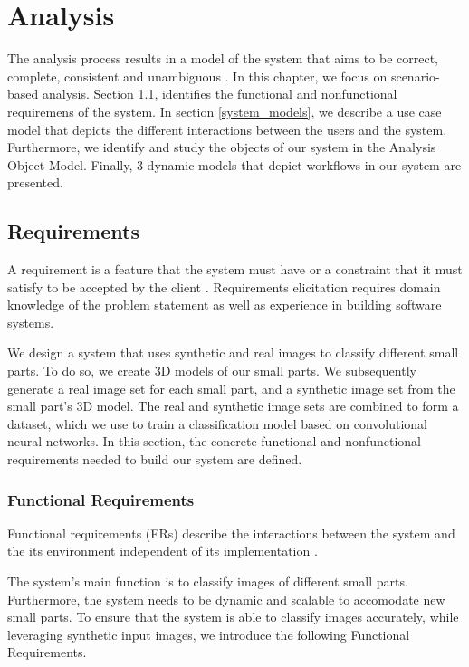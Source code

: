 \chapter{Analysis}\label{ch:analysis}

The analysis process results in a model of the system that aims to be correct, complete, consistent and unambiguous \cite{bruegge2004object}. In this chapter, we focus on scenario-based analysis. Section \ref{requirements}, identifies the functional and nonfunctional requiremens of the system. In section \ref{system_models}, we describe a use case model that depicts the different interactions between the users and the system. Furthermore, we identify and study the objects of our system in the Analysis Object Model. Finally, 3 dynamic models that depict workflows in our system are presented.


\section{Requirements}\label{requirements}

A requirement is a feature that the system must have or a constraint that it must satisfy to be accepted by the client \cite{bruegge2004object}. Requirements elicitation requires domain knowledge of the problem statement as well as experience in building software systems.

We design a system that uses synthetic and real images to classify different small parts. To do so, we create 3D models of our small parts. We subsequently generate a real image set for each small part, and a synthetic image set from the small part's 3D model. The real and synthetic image sets are combined to form a dataset, which we use to train a classification model based on convolutional neural networks. In this section, the concrete functional and nonfunctional requirements needed to build our system are defined.

\subsection{Functional Requirements}
Functional requirements (FRs) describe the interactions between the system and the its environment independent of its implementation \cite{bruegge2004object}.

The system's main function is to classify images of different small parts. Furthermore, the system needs to be dynamic and scalable to accomodate new small parts. To ensure that the system is able to classify images accurately, while leveraging synthetic input images, we introduce the following Functional Requirements.

